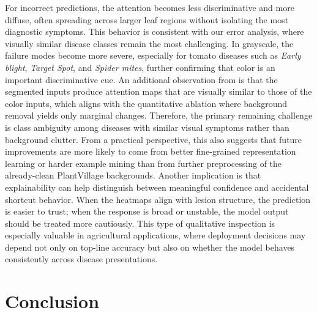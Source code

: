 \documentclass[10pt,twocolumn,letterpaper]{article}
\begin{document}
For incorrect predictions, the attention becomes less discriminative and more diffuse, often spreading across larger leaf regions without isolating the most diagnostic symptoms. This behavior is consistent with our error analysis, where visually similar disease classes remain the most challenging. In grayscale, the failure modes become more severe, especially for tomato diseases such as \textit{Early blight}, \textit{Target Spot}, and \textit{Spider mites}, further confirming that color is an important discriminative cue. An additional observation from  is that the segmented inputs produce attention maps that are visually similar to those of the color inputs, which aligns with the quantitative ablation where background removal yields only marginal changes. Therefore, the primary remaining challenge is class ambiguity among diseases with similar visual symptoms rather than background clutter. From a practical perspective, this also suggests that future improvements are more likely to come from better fine-grained representation learning or harder example mining than from further preprocessing of the already-clean PlantVillage backgrounds. Another implication is that explainability can help distinguish between meaningful confidence and accidental shortcut behavior. When the heatmaps align with lesion structure, the prediction is easier to trust; when the response is broad or unstable, the model output should be treated more cautiously. This type of qualitative inspection is especially valuable in agricultural applications, where deployment decisions may depend not only on top-line accuracy but also on whether the model behaves consistently across disease presentations.

\section{Conclusion}
\end{document}
